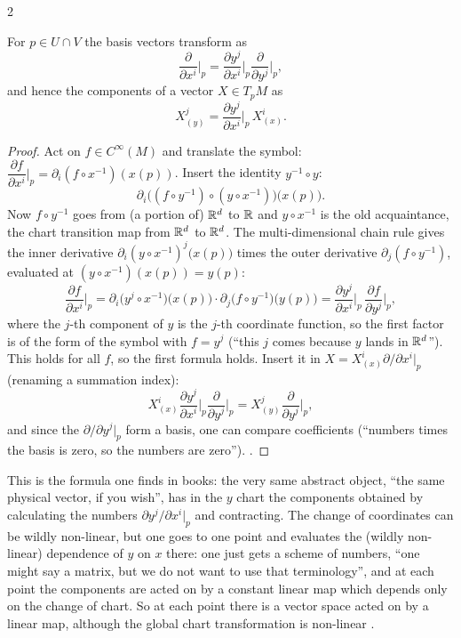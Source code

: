 \begin{paracol}{2}
\begin{theorem}\label{thm:c05-changeV}
For $p\in U\cap V$ the basis vectors transform as
\[
  \frac{\partial}{\partial x^i}\Big|_p=\frac{\partial y^j}{\partial x^i}\Big|_p\frac{\partial}{\partial y^j}\Big|_p,
\]
and hence the components of a vector $X\in T_pM$ as
\[
  X^j_{(y)}=\frac{\partial y^j}{\partial x^i}\Big|_p\,X^i_{(x)}.
\]
\end{theorem}
\begin{proof}
Act on $f\in C^\infty(M)$ and translate the symbol: $\dfrac{\partial f}{\partial x^i}\Big|_p=\partial_i(f\circ x^{-1})(x(p))$. Insert the identity $y^{-1}\circ y$:
\[
  \partial_i\bigl((f\circ y^{-1})\circ(y\circ x^{-1})\bigr)\bigl(x(p)\bigr).
\]
Now $f\circ y^{-1}$ goes from (a portion of) $\mathbb{R}^d$ to $\mathbb{R}$ and $y\circ x^{-1}$ is the old acquaintance, the chart transition map from $\mathbb{R}^d$ to $\mathbb{R}^d$. The multi-dimensional chain rule gives the inner derivative $\partial_i(y\circ x^{-1})^j\bigl(x(p)\bigr)$ times the outer derivative $\partial_j(f\circ y^{-1})$, evaluated at $(y\circ x^{-1})(x(p))=y(p)$:
\[
  \frac{\partial f}{\partial x^i}\Big|_p=\partial_i\bigl(y^j\circ x^{-1}\bigr)\bigl(x(p)\bigr)\cdot\partial_j\bigl(f\circ y^{-1}\bigr)\bigl(y(p)\bigr)=\frac{\partial y^j}{\partial x^i}\Big|_p\,\frac{\partial f}{\partial y^j}\Big|_p,
\]
where the $j$-th component of $y$ is the $j$-th coordinate function, so the first factor is of the form of the symbol with $f=y^j$ (``this $j$ comes because $y$ lands in $\mathbb{R}^d$''). This holds for all $f$, so the first formula holds. Insert it in $X=X^i_{(x)}\partial/\partial x^i|_p$ (renaming a summation index):
\[
  X^i_{(x)}\frac{\partial y^j}{\partial x^i}\Big|_p\frac{\partial}{\partial y^j}\Big|_p=X^j_{(y)}\frac{\partial}{\partial y^j}\Big|_p,
\]
and since the $\partial/\partial y^j|_p$ form a basis, one can compare coefficients (``numbers times the basis is zero, so the numbers are zero'').
.
\end{proof}
This is the formula one finds in books: the very same abstract object, ``the same physical vector, if you wish'', has in the $y$ chart the components obtained by calculating the numbers $\partial y^j/\partial x^i|_p$ and contracting. The change of coordinates can be wildly non-linear, but one goes to one point and evaluates the (wildly non-linear) dependence of $y$ on $x$ there:
one just gets a scheme of numbers, ``one might say a matrix, but we do not want to use that terminology'', and at each point the components are acted on by a constant linear map which depends only on the change of chart. So at each point there is a vector space acted on by a linear map, although the global chart transformation is non-linear .


\end{paracol}
